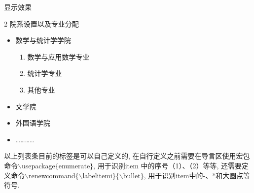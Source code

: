 \centerline{显示效果\vspace*{-10pt}}
\begin{multicols}{2}
 院系设置以及专业分配
\begin{itemize}
\item{数学与统计学学院}
\begin{enumerate}
 \item 数学与应用数学专业
  \item 统计学专业
  \item 其他专业
\end{enumerate}
\item{文学院}
\item{外国语学院}
\item{…………}
\end{itemize}
\end{multicols}

以上列表条目前的标签是可以自己定义的, 在自行定义之前需要在导言区使用宏包命令$\backslash$usepackage$\{$enumerate$\}$, 用于识别item 中的序号（1）、（2）等等, 还需要定义命令$\backslash$renewcommand$\{\backslash$labelitemi$\}\{\backslash$bullet$\}$,
用于识别item中的-、*和大圆点等符号.


